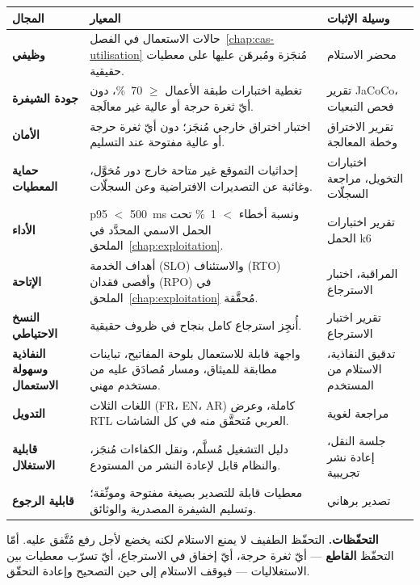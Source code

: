 \begin{xltabular}{\textwidth}{>{\bfseries}p{3.2cm} X p{3.4cm}}
\toprule
\textbf{المجال} & \textbf{المعيار} & \textbf{وسيلة الإثبات} \\
\midrule
\endhead
وظيفي & حالات الاستعمال في الفصل~\ref{chap:cas-utilisation} مُنجَزة ومُبرهَن عليها على معطيات حقيقية. & محضر الاستلام \\
\addlinespace
جودة الشيفرة & تغطية اختبارات طبقة الأعمال $\geq$ 70~\%، دون أيّ ثغرة حرجة أو عالية غير معالَجة. & تقرير JaCoCo، فحص التبعيات \\
\addlinespace
الأمان & اختبار اختراق خارجي مُنجَز؛ دون أيّ ثغرة حرجة أو عالية مفتوحة عند التسليم. & تقرير الاختراق وخطة المعالجة \\
\addlinespace
حماية المعطيات & إحداثيات التموقع غير متاحة خارج دور مُخوَّل، وغائبة عن التصديرات الافتراضية وعن السجلّات. & اختبارات التخويل، مراجعة السجلّات \\
\addlinespace
الأداء & p95 $<$ 500~ms ونسبة أخطاء $<$ 1~\% تحت الحمل الاسمي المحدَّد في الملحق~\ref{chap:exploitation}. & تقرير اختبارات الحمل k6 \\
\addlinespace
الإتاحة & أهداف الخدمة (SLO) والاستئناف (RTO) وأقصى فقدان (RPO) في الملحق~\ref{chap:exploitation} مُحقَّقة. & المراقبة، اختبار الاسترجاع \\
\addlinespace
النسخ الاحتياطي & أُنجِز استرجاع كامل بنجاح في ظروف حقيقية. & تقرير اختبار الاسترجاع \\
\addlinespace
النفاذية وسهولة الاستعمال & واجهة قابلة للاستعمال بلوحة المفاتيح، تباينات مطابقة للميثاق، ومسار مُصادَق عليه من مستخدم مهني. & تدقيق النفاذية، الاستلام من المستخدم \\
\addlinespace
التدويل & اللغات الثلاث (FR، EN، AR) كاملة، وعرض RTL العربي مُتحقَّق منه في كل الشاشات. & مراجعة لغوية \\
\addlinespace
قابلية الاستغلال & دليل التشغيل مُسلَّم، ونقل الكفاءات مُنجَز، والنظام قابل لإعادة النشر من المستودع. & جلسة النقل، إعادة نشر تجريبية \\
\addlinespace
قابلية الرجوع & معطيات قابلة للتصدير بصيغة مفتوحة وموثّقة؛ وتسليم الشيفرة المصدرية والوثائق. & تصدير برهاني \\
\bottomrule
\end{xltabular}

\begin{encadre}
\textbf{التحفّظات.} التحفّظ الطفيف لا يمنع الاستلام لكنه يخضع لأجل رفع مُتَّفق
عليه. أمّا التحفّظ \textbf{القاطع} --- أيّ ثغرة حرجة، أيّ إخفاق في الاسترجاع،
أيّ تسرّب معطيات بين الاستغلاليات --- فيوقف الاستلام إلى حين التصحيح وإعادة
التحقّق.
\end{encadre}

